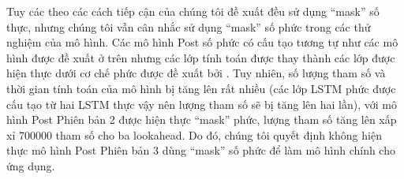 			Tuy các theo các cách tiếp cận của chúng tôi đề xuất đều sử dụng ``mask'' số thực, nhưng chúng tôi vẫn cân nhắc sử dụng ``mask'' số phức trong các thử nghiệm của mô hình. Các mô hình Post số phức có cấu tạo tương tự như các mô hình được đề xuất ở trên nhưng các lớp tính toán được thay thành các lớp được hiện thực dưới cơ chế phức được đề xuất bởi \cite{dccrn}. Tuy nhiên, số lượng tham số và thời gian tính toán của mô hình bị tăng lên rất nhiều (các lớp LSTM phức được cấu tạo từ hai LSTM thực vậy nên lượng tham số sẽ bị tăng lên hai lần), với mô hình Post Phiên bản 2 được hiện thực ``mask'' phức, lượng tham số tăng lên xấp xỉ 700000 tham số cho ba lookahead. Do đó, chúng tôi quyết định không hiện thực mô hình Post Phiên bản 3 dùng ``mask'' số phức để làm mô hình chính cho ứng dụng.